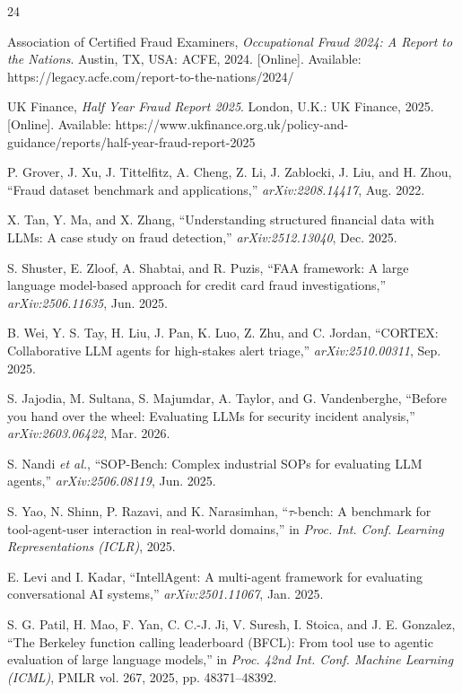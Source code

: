 \documentclass[]{ieeeaccess}
\begin{document}
\begin{thebibliography}{24}

Association of Certified Fraud Examiners, \textit{Occupational Fraud
2024: A Report to the Nations}. Austin, TX, USA: ACFE, 2024. [Online].
Available: https://legacy.acfe.com/report-to-the-nations/2024/

UK Finance, \textit{Half Year Fraud Report 2025}. London, U.K.: UK
Finance, 2025. [Online]. Available:
https://www.ukfinance.org.uk/policy-and-guidance/reports/half-year-fraud-report-2025

P. Grover, J. Xu, J. Tittelfitz, A. Cheng, Z. Li, J. Zablocki, J. Liu,
and H. Zhou, ``Fraud dataset benchmark and applications,''
\textit{arXiv:2208.14417}, Aug. 2022.

X. Tan, Y. Ma, and X. Zhang, ``Understanding structured financial data
with LLMs: A case study on fraud detection,'' \textit{arXiv:2512.13040},
Dec. 2025.

S. Shuster, E. Zloof, A. Shabtai, and R. Puzis, ``FAA framework: A
large language model-based approach for credit card fraud
investigations,'' \textit{arXiv:2506.11635}, Jun. 2025.

B. Wei, Y. S. Tay, H. Liu, J. Pan, K. Luo, Z. Zhu, and C. Jordan,
``CORTEX: Collaborative LLM agents for high-stakes alert triage,''
\textit{arXiv:2510.00311}, Sep. 2025.

S. Jajodia, M. Sultana, S. Majumdar, A. Taylor, and G. Vandenberghe,
``Before you hand over the wheel: Evaluating LLMs for security incident
analysis,'' \textit{arXiv:2603.06422}, Mar. 2026.

S. Nandi \textit{et al.}, ``SOP-Bench: Complex industrial SOPs for
evaluating LLM agents,'' \textit{arXiv:2506.08119}, Jun. 2025.

S. Yao, N. Shinn, P. Razavi, and K. Narasimhan, ``$\tau$-bench: A
benchmark for tool-agent-user interaction in real-world domains,'' in
\textit{Proc. Int. Conf. Learning Representations (ICLR)}, 2025.

E. Levi and I. Kadar, ``IntellAgent: A multi-agent framework for
evaluating conversational AI systems,'' \textit{arXiv:2501.11067}, Jan.
2025.

S. G. Patil, H. Mao, F. Yan, C. C.-J. Ji, V. Suresh, I. Stoica, and J. E.
Gonzalez, ``The Berkeley function calling leaderboard (BFCL): From tool
use to agentic evaluation of large language models,'' in
\textit{Proc. 42nd Int. Conf. Machine Learning (ICML)}, PMLR vol. 267,
2025, pp. 48371--48392.


\end{thebibliography}
\end{document}
